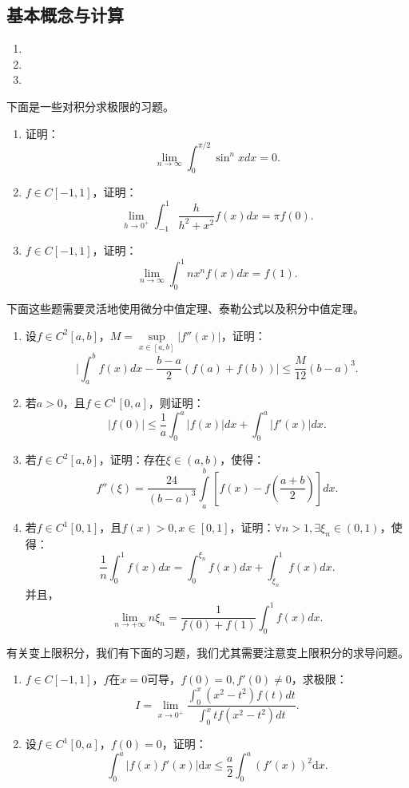     \subsection{基本概念与计算}
    \begin{enumerate}
        \item 
        \item 
        \item 
    \end{enumerate}
    下面是一些对积分求极限的习题。
    \begin{exercise}
        \begin{enumerate}
            \item 证明：$$\lim\limits_{n\rightarrow\infty}\int_{0}^{\pi/2}\sin^nxdx=0.$$
            \item $f\in C\left[-1,1\right]$，证明：$$\lim\limits_{h\rightarrow0^+}\int_{-1}^{1}\frac{h}{h^2+x^2}f(x)dx= \pi f(0).$$
            \item $f\in C\left[-1,1\right]$，证明：$$\lim\limits_{n\rightarrow\infty}\int_{0}^{1}nx^nf(x)dx=f(1).$$
        \end{enumerate}
    \end{exercise}
    下面这些题需要灵活地使用微分中值定理、泰勒公式以及积分中值定理。
    \begin{exercise}
        \begin{enumerate}
            \item 设$f\in C^2\left[a,b\right]$，$M=\sup\limits_{x\in\left[a,b\right]}\lvert f''(x)\rvert$，证明：$$\lvert\int_{a}^{b}f(x)dx-\frac{b-a}{2}\left(f(a)+f(b)\right)\rvert\leq\frac{M}{12}(b-a)^3.$$
            \item 若$a>0$，且$f\in C^1\left[0,a\right]$，则证明：$$\lvert f(0)\rvert\leq\frac{1}{a}\int_{0}^{a}\lvert f(x)\rvert dx+\int_{0}^{a}\lvert f'(x)\rvert dx.$$
            \item 若$f\in C^2\left[a,b\right]$，证明：存在$\xi\in\left(a,b\right)$，使得：$$f''(\xi)=\frac{24}{(b-a)^3}\int\limits_{a}^{b}\left[f(x)-f(\frac{a+b}{2})\right]dx.$$
            \item 若$f\in C^1\left[0,1\right]$，且$f(x)>0,x\in\left[0,1\right]$，证明：$\forall n>1,\exists \xi_n\in\left(0,1\right)$，使得：$$\frac{1}{n}\int_{0}^{1}f(x)dx=\int_{0}^{\xi_n}f(x)dx+\int_{\xi_n}^{1}f(x)dx.$$并且，
            \[\lim\limits_{n\rightarrow+\infty}n\xi_n=\frac{1}{f(0)+f(1)}\int_{0}^{1}f(x)dx.\]
        \end{enumerate}
    \end{exercise}
    有关变上限积分，我们有下面的习题，我们尤其需要注意变上限积分的求导问题。
    \begin{exercise}
        \begin{enumerate}
            \item $f\in C\left[-1,1\right]$，$f$在$x=0$可导，$f(0)=0,f'(0)\neq0$，求极限：$$I=\lim\limits_{x\rightarrow0^+}\dfrac{\displaystyle \int_{0}^{x}(x^2-t^2)f(t)dt}{\displaystyle \int_{0}^{x}tf(x^2-t^2)dt}.$$
            \item 设$f\in C^1\left[0,a\right]$，$f(0)=0$，证明：\[\int_{0}^{a}\vert  f(x)f'(x)\vert\mathrm{d}x\leq\frac{a}{2}\int_{0}^{a}(f'(x))^2\mathrm{d}x.\]
        \end{enumerate}
    \end{exercise}
